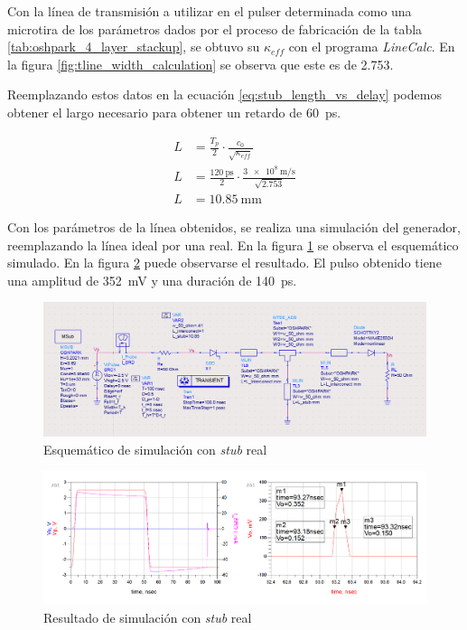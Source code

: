 Con la línea de transmisión a utilizar en el pulser determinada como una
microtira de los parámetros dados por el proceso de fabricación de la tabla
\ref{tab:oshpark_4_layer_stackup}, se obtuvo su $\kappa_{eff}$ con el programa
\textit{LineCalc}. En la figura \ref{fig:tline_width_calculation} se observa que
este es de \num{2.753}.

Reemplazando estos datos en la ecuación \ref{eq:stub_length_vs_delay} podemos
obtener el largo necesario para obtener un retardo de \qty{60}{\pico\second}.

\begin{equation}
    \begin{aligned}
        L &= \frac{T_p}{2} \cdot \frac{c_0}{\sqrt{\kappa_{eff}}} \\
        L &= \frac{\qty{120}{\pico\second}}{2} \cdot \frac{
            \qty{3e8}{\meter\per\second}}{\sqrt{2.753}} \\
        L &= \qty{10.85}{\milli\meter}
    \end{aligned}
\end{equation}

Con los parámetros de la línea obtenidos, se realiza una simulación del
generador, reemplazando la línea ideal por una real. En la figura
\ref{fig:real_stub_simulation_sch} se observa el esquemático simulado. En la
figura \ref{fig:real_stub_simulation_result} puede observarse el resultado. El
pulso obtenido tiene una amplitud de \qty{352}{\milli\volt} y una duración de
\qty{140}{\pico\second}.

\begin{figure}[tbp]
    \centering
    \includegraphics[width=\textwidth]{images/real_stub_simulation_sch.png}
    \caption{Esquemático de simulación con \textit{stub} real}
    \label{fig:real_stub_simulation_sch}
\end{figure}

\begin{figure}[tbp]
    \centering
    \includegraphics[width=\textwidth]{images/real_stub_simulation_result.png}
    \caption{Resultado de simulación con \textit{stub} real}
    \label{fig:real_stub_simulation_result}
\end{figure}


